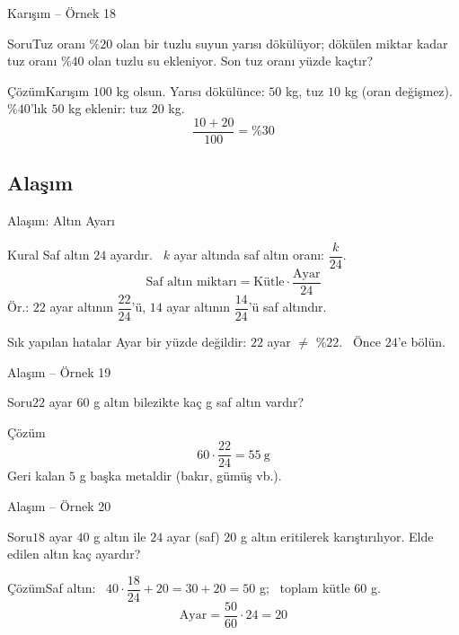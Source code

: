 \documentclass[aspectratio=169,11pt,handout]{beamer}
\newcommand{\soru}[3]{%
\begin{frame}{#1}
  \begin{block}{Soru}\large #2\end{block}
  \pause
  \begin{exampleblock}{Çözüm}\large #3\end{exampleblock}
\end{frame}}
\begin{document}
\soru{Karışım -- Örnek 18}
{Tuz oranı \(\%20\) olan bir tuzlu suyun yarısı dökülüyor; dökülen miktar kadar tuz oranı \(\%40\) olan tuzlu su ekleniyor. Son tuz oranı yüzde kaçtır?}
{Karışım \(100\) kg olsun. Yarısı dökülünce: \(50\) kg, tuz \(10\) kg (oran değişmez).\\[3pt]
\(\%40\)'lık \(50\) kg eklenir: tuz \(20\) kg.
\[\frac{10+20}{100}=\%30\]}

\subsection{Alaşım}
\begin{frame}{Alaşım: Altın Ayarı}
\begin{block}{Kural}
Saf altın \(24\) ayardır. \ \(k\) ayar altında saf altın oranı: \(\dfrac{k}{24}\).
\[\text{Saf altın miktarı}=\text{Kütle}\cdot\frac{\text{Ayar}}{24}\]
Ör.: \(22\) ayar altının \(\dfrac{22}{24}\)'ü, \(14\) ayar altının \(\dfrac{14}{24}\)'ü saf altındır.
\end{block}
\begin{alertblock}{Sık yapılan hatalar}
Ayar bir yüzde değildir: \(22\) ayar \(\neq\) \(\%22\). \ Önce \(24\)'e bölün.
\end{alertblock}
\end{frame}

\soru{Alaşım -- Örnek 19}
{\(22\) ayar \(60\) g altın bilezikte kaç g saf altın vardır?}
{\[60\cdot\frac{22}{24}=55\ \text{g}\]
Geri kalan \(5\) g başka metaldir (bakır, gümüş vb.).}

\soru{Alaşım -- Örnek 20}
{\(18\) ayar \(40\) g altın ile \(24\) ayar (saf) \(20\) g altın eritilerek karıştırılıyor. Elde edilen altın kaç ayardır?}
{Saf altın: \ \(40\cdot\dfrac{18}{24}+20=30+20=50\) g; \ toplam kütle \(60\) g.
\[\text{Ayar}=\frac{50}{60}\cdot 24=20\]}
\end{document}
